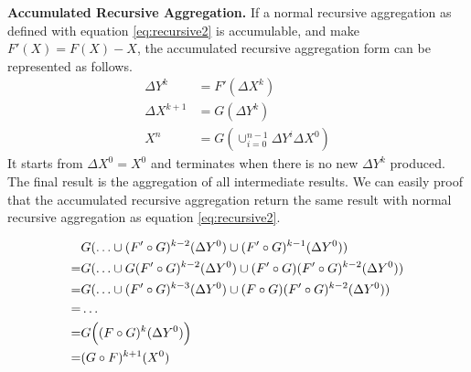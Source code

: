 {	\textbf{Accumulated Recursive Aggregation.} If a normal recursive aggregation  as defined with equation \ref{eq:recursive2} is accumulable, and make $F'(X)=F(X)-X$,  the accumulated recursive aggregation form can be represented as follows.
	\begin{equation}\label{eq:accumasync}
	\begin{aligned}
	\Delta Y^{k}&= F'(\Delta X^k)\\
	\Delta X^{k+1}&= G(\Delta Y^{k})\\
	X^{n}&=G(\cup_{i=0}^{n-1} \Delta Y^{i}\Delta X^0)
	\end{aligned}
	\end{equation}
	It starts from $\Delta X^0=X^0$ and terminates when there is no new $\Delta Y^k$ produced. The final result is the aggregation of all intermediate results. We can easily proof that the accumulated recursive aggregation return the same result with normal recursive aggregation as equation \ref{eq:recursive2}.
	

{\color{yellow}
	\small
\begin{align}
&G( \ldots\cup (F'\circ G)^{k-2}(\Delta Y^0)\cup(F'\circ G)^{k-1}(\Delta Y^0))\notag \\
=&G( \ldots\cup G(F'\circ G)^{k-2}(\Delta Y^0)\cup(F'\circ G)(F'\circ G)^{k-2}(\Delta Y^0))\notag\\
=&G( \ldots\cup (F'\circ G)^{k-3}(\Delta Y^0)\cup(F\circ G)(F'\circ G)^{k-2}(\Delta Y^0))\notag\\
=& \ldots \notag \\
=&G\Big((F\circ G)^k(\Delta Y^0)\Big)\notag\\
=&(G \circ F)^{k+1}(X^0)\notag
\end{align}

}}
